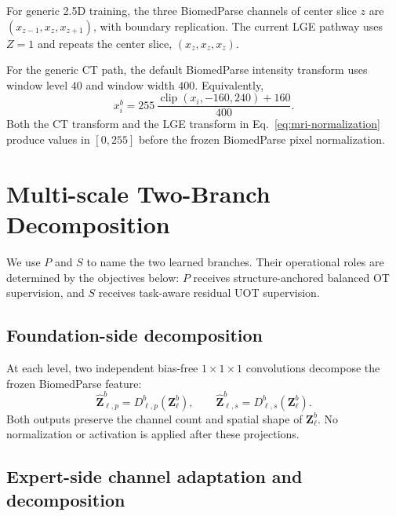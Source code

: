 \documentclass[10pt]{article}
\newcommand{\clip}{\operatorname{clip}}
\begin{document}
For generic 2.5D training, the three BiomedParse channels of center slice $z$ are
$(x_{z-1},x_z,x_{z+1})$, with boundary replication.  The current LGE pathway uses
$Z=1$ and repeats the center slice, $(x_z,x_z,x_z)$.

For the generic CT path, the default BiomedParse intensity transform uses window
level $40$ and window width $400$.  Equivalently,
\begin{equation}
    x_i^b=255\,
    \frac{\clip(x_i,-160,240)+160}{400}.
\end{equation}
Both the CT transform and the LGE transform in Eq.~\eqref{eq:mri-normalization}
produce values in $[0,255]$ before the frozen BiomedParse pixel normalization.

\section{Multi-scale Two-Branch Decomposition}


We use $P$ and $S$ to name the two learned branches.  Their operational roles
are determined by the objectives below: $P$ receives structure-anchored balanced
OT supervision, and $S$ receives task-aware residual UOT supervision.

\subsection{Foundation-side decomposition}

At each level, two independent bias-free $1\!\times\!1\!\times\!1$
convolutions decompose the frozen BiomedParse feature:
\begin{equation}
    \widehat{\bm{Z}}^{b}_{\ell,p}
        =D^{b}_{\ell,p}(\bm{Z}^{b}_{\ell}),
    \qquad
    \widehat{\bm{Z}}^{b}_{\ell,s}
        =D^{b}_{\ell,s}(\bm{Z}^{b}_{\ell}).
    \label{eq:base-decomposition}
\end{equation}
Both outputs preserve the channel count and spatial shape of
$\bm{Z}^{b}_{\ell}$.  No normalization or activation is applied after these
projections.

\subsection{Expert-side channel adaptation and decomposition}
\end{document}
